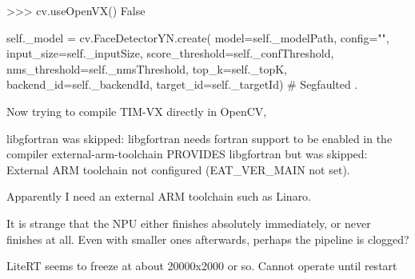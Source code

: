 >>> cv.useOpenVX()
False

self._model = cv.FaceDetectorYN.create(
            model=self._modelPath,
            config="",
            input_size=self._inputSize,
            score_threshold=self._confThreshold,
            nms_threshold=self._nmsThreshold,
            top_k=self._topK,
            backend_id=self._backendId,
            target_id=self._targetId)
	    # Segfaulted
\endtt
.

Now trying to compile TIM-VX directly in OpenCV,

\begtt
libgfortran was skipped: libgfortran needs fortran support to be enabled in the compiler
external-arm-toolchain PROVIDES libgfortran but was skipped: External ARM toolchain not configured (EAT_VER_MAIN not set).
\endtt

Apparently I need an external ARM toolchain such as Linaro.



It is strange that the NPU either finishes absolutely immediately,
or never finishes at all.
Even with smaller ones afterwards, perhaps the pipeline is clogged?


LiteRT seems to freeze at about 20000x2000 or so.
Cannot operate until restart

